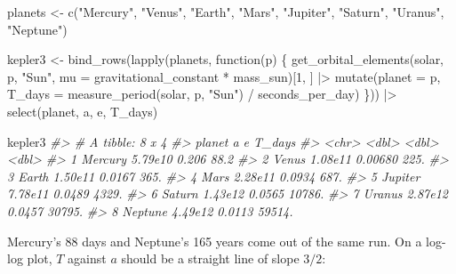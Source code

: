 \documentclass[
  10.5pt,
  letterpaper,
]{scrbook}
\newenvironment{Shaded}{\begin{snugshade}}{\end{snugshade}}
\newcommand{\AttributeTok}[1]{\textcolor[rgb]{0.00,0.00,0.00}{#1}}
\newcommand{\CommentTok}[1]{\textcolor[rgb]{0.00,0.00,0.00}{\textit{#1}}}
\newcommand{\ControlFlowTok}[1]{\textcolor[rgb]{0.00,0.00,0.00}{#1}}
\newcommand{\DecValTok}[1]{\textcolor[rgb]{0.00,0.00,0.00}{#1}}
\newcommand{\FunctionTok}[1]{\textcolor[rgb]{0.00,0.00,0.00}{#1}}
\newcommand{\NormalTok}[1]{\textcolor[rgb]{0.00,0.00,0.00}{#1}}
\newcommand{\OtherTok}[1]{\textcolor[rgb]{0.00,0.00,0.00}{#1}}
\newcommand{\SpecialCharTok}[1]{\textcolor[rgb]{0.00,0.00,0.00}{#1}}
\newcommand{\StringTok}[1]{\textcolor[rgb]{0.00,0.00,0.00}{#1}}
\theoremstyle{definition}
\theoremstyle{plain}
\theoremstyle{remark}
\begin{document}
\begin{Shaded}
\begin{Highlighting}[]
\NormalTok{planets }\OtherTok{\textless{}{-}} \FunctionTok{c}\NormalTok{(}\StringTok{"Mercury"}\NormalTok{, }\StringTok{"Venus"}\NormalTok{, }\StringTok{"Earth"}\NormalTok{, }\StringTok{"Mars"}\NormalTok{,}
             \StringTok{"Jupiter"}\NormalTok{, }\StringTok{"Saturn"}\NormalTok{, }\StringTok{"Uranus"}\NormalTok{, }\StringTok{"Neptune"}\NormalTok{)}

\NormalTok{kepler3 }\OtherTok{\textless{}{-}} \FunctionTok{bind\_rows}\NormalTok{(}\FunctionTok{lapply}\NormalTok{(planets, }\ControlFlowTok{function}\NormalTok{(p) \{}
  \FunctionTok{get\_orbital\_elements}\NormalTok{(solar, p, }\StringTok{"Sun"}\NormalTok{, }\AttributeTok{mu =}\NormalTok{ gravitational\_constant }\SpecialCharTok{*}\NormalTok{ mass\_sun)[}\DecValTok{1}\NormalTok{, ] }\SpecialCharTok{|\textgreater{}}
    \FunctionTok{mutate}\NormalTok{(}\AttributeTok{planet =}\NormalTok{ p,}
           \AttributeTok{T\_days =} \FunctionTok{measure\_period}\NormalTok{(solar, p, }\StringTok{"Sun"}\NormalTok{) }\SpecialCharTok{/}\NormalTok{ seconds\_per\_day)}
\NormalTok{\})) }\SpecialCharTok{|\textgreater{}}
  \FunctionTok{select}\NormalTok{(planet, a, e, T\_days)}

\NormalTok{kepler3}
\CommentTok{\#\textgreater{} \# A tibble: 8 x 4}
\CommentTok{\#\textgreater{}   planet        a       e  T\_days}
\CommentTok{\#\textgreater{}   \textless{}chr\textgreater{}     \textless{}dbl\textgreater{}   \textless{}dbl\textgreater{}   \textless{}dbl\textgreater{}}
\CommentTok{\#\textgreater{} 1 Mercury 5.79e10 0.206      88.2}
\CommentTok{\#\textgreater{} 2 Venus   1.08e11 0.00680   225. }
\CommentTok{\#\textgreater{} 3 Earth   1.50e11 0.0167    365. }
\CommentTok{\#\textgreater{} 4 Mars    2.28e11 0.0934    687. }
\CommentTok{\#\textgreater{} 5 Jupiter 7.78e11 0.0489   4329. }
\CommentTok{\#\textgreater{} 6 Saturn  1.43e12 0.0565  10786. }
\CommentTok{\#\textgreater{} 7 Uranus  2.87e12 0.0457  30795. }
\CommentTok{\#\textgreater{} 8 Neptune 4.49e12 0.0113  59514.}
\end{Highlighting}
\end{Shaded}

Mercury's 88 days and Neptune's 165 years come out of the same run. On a
log-log plot, \(T\) against \(a\) should be a straight line of slope
\(3/2\):
\end{document}
